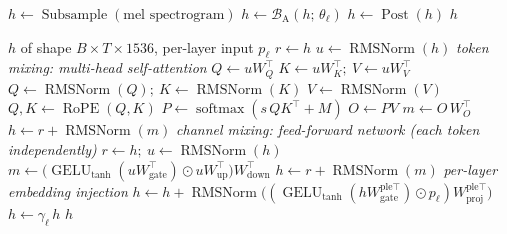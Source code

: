 \documentclass[10pt,a4paper]{article}
\newcommand{\op}[1]{\operatorname{#1}}
\theoremstyle{definition}
\begin{document}
\begin{algorithm}[H]
\caption{Audio encoder}\label{alg:audio}
\begin{algorithmic}[1]
\State $h \gets \op{Subsample}(\text{mel spectrogram})$ 
 
\State $h \gets \mathcal{B}_{\mathrm{A}}(h;\,\theta_\ell)$ 
\EndFor
\State $h \gets \op{Post}(h)$ 
\State \Return $h$
\end{algorithmic}
\end{algorithm}
\begin{algorithm}[H]
\caption{Block $\mathcal{B}_{\mathrm{S1}}(h)$ --- Sliding-window attention block (MLP width 6144)}
\begin{algorithmic}[1]
\Require $h$ of shape $B\times T\times 1536$, per-layer input $p_\ell$
\State $r \gets h$ 
\State $u \gets \op{RMSNorm}(h)$ 
\Statex \hspace{-1.2em}\textit{token mixing: multi-head self-attention}
\State $Q \gets u W_Q^{\top}$ 
\State $K \gets u W_K^{\top};\ V \gets u W_V^{\top}$ 
\State $Q \gets \op{RMSNorm}(Q);\ K \gets \op{RMSNorm}(K)$ 
\State $V \gets \op{RMSNorm}(V)$
\State $Q, K \gets \op{RoPE}(Q, K)$ 
\State $P \gets \op{softmax}(s\, Q K^{\top} + M)$ 
\State $O \gets P V$ 
\State $m \gets O\, W_O^{\top}$ 
\State $h \gets r + \op{RMSNorm}(m)$ 
\Statex \hspace{-1.2em}\textit{channel mixing: feed-forward network (each token independently)}
\State $r \gets h;\ u \gets \op{RMSNorm}(h)$
\State $m \gets \big(\op{GELU}_{\tanh}(u W_{\mathrm{gate}}^{\top}) \odot u W_{\mathrm{up}}^{\top}\big) W_{\mathrm{down}}^{\top}$ 
\State $h \gets r + \op{RMSNorm}(m)$ 
\Statex \hspace{-1.2em}\textit{per-layer embedding injection}
\State $h \gets h + \op{RMSNorm}\big((\op{GELU}_{\tanh}(h W^{\mathrm{ple}\top}_{\mathrm{gate}}) \odot p_\ell) W^{\mathrm{ple}\top}_{\mathrm{proj}}\big)$ 
\State $h \gets \gamma_\ell\, h$ 
\State \Return $h$
\end{algorithmic}
\end{algorithm}
\end{document}
